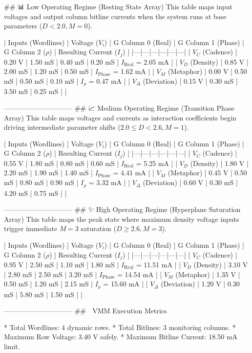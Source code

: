 ## 📊 Low Operating Regime (Resting State Array)
This table maps input voltages and output column bitline currents when the system runs at base parameters ($D < 2.0, M = 0$).

| Inputs (Wordlines) | Voltage ($V_i$) | G Column 0 (Real) | G Column 1 (Phase) | G Column 2 ($\rho$) | Resulting Current ($I_j$) |
|---|---|---|---|---|---|
| $V_C$ (Cadence) | 0.20 V | 1.50 mS | 0.40 mS | 0.20 mS | $I_{\text{Real}}$ = 2.05 mA |
| $V_D$ (Density) | 0.85 V | 2.00 mS | 1.20 mS | 0.50 mS | $I_{\text{Phase}}$ = 1.62 mA |
| $V_M$ (Metaphor) | 0.00 V | 0.50 mS | 0.50 mS | 0.10 mS | $I_\rho$ = 0.47 mA |
| $V_\Delta$ (Deviation) | 0.15 V | 0.30 mS | 3.50 mS | 0.25 mS | |

------------------------------
## 📈 Medium Operating Regime (Transition Phase Array)
This table maps voltages and currents as interaction coefficients begin driving intermediate parameter shifts ($2.0 \le D < 2.6, M = 1$).

| Inputs (Wordlines) | Voltage ($V_i$) | G Column 0 (Real) | G Column 1 (Phase) | G Column 2 ($\rho$) | Resulting Current ($I_j$) |
|---|---|---|---|---|---|
| $V_C$ (Cadence) | 0.55 V | 1.80 mS | 0.80 mS | 0.60 mS | $I_{\text{Real}}$ = 5.25 mA |
| $V_D$ (Density) | 1.80 V | 2.20 mS | 1.90 mS | 1.40 mS | $I_{\text{Phase}}$ = 4.41 mA |
| $V_M$ (Metaphor) | 0.45 V | 0.50 mS | 0.80 mS | 0.90 mS | $I_\rho$ = 3.32 mA |
| $V_\Delta$ (Deviation) | 0.60 V | 0.30 mS | 4.20 mS | 0.75 mS | |

------------------------------
## ✨ High Operating Regime (Hyperplane Saturation Array)
This table maps the peak state where maximum density voltage inputs trigger immediate $M=3$ saturation ($D \ge 2.6, M = 3$).

| Inputs (Wordlines) | Voltage ($V_i$) | G Column 0 (Real) | G Column 1 (Phase) | G Column 2 ($\rho$) | Resulting Current ($I_j$) |
|---|---|---|---|---|---|
| $V_C$ (Cadence) | 0.95 V | 2.50 mS | 1.10 mS | 1.80 mS | $I_{\text{Real}}$ = 11.51 mA |
| $V_D$ (Density) | 3.10 V | 2.80 mS | 2.50 mS | 3.20 mS | $I_{\text{Phase}}$ = 14.54 mA |
| $V_M$ (Metaphor) | 1.35 V | 0.50 mS | 1.20 mS | 2.15 mS | $I_\rho$ = 15.60 mA |
| $V_\Delta$ (Deviation) | 1.20 V | 0.30 mS | 5.80 mS | 1.50 mS | |

------------------------------
## 🔎 VMM Execution Metrics

* Total Wordlines: 4 dynamic rows.
* Total Bitlines: 3 monitoring columns.
* Maximum Row Voltage: 3.40 V safely.
* Maximum Bitline Current: 18.50 mA limit.


